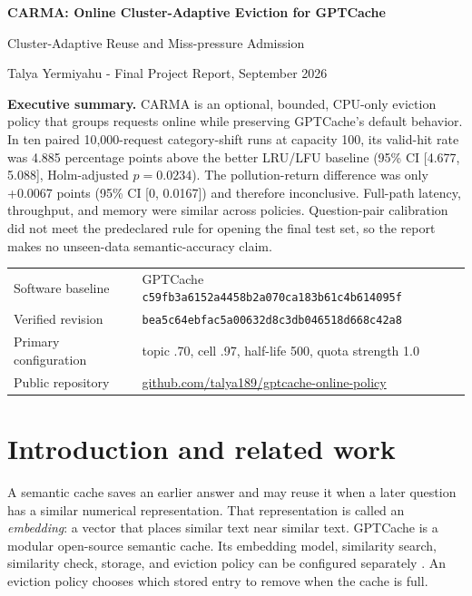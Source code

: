 \documentclass[10pt,letterpaper]{article}
\newcommand{\code}[1]{\texttt{#1}}
\begin{document}
\begin{center}
  {\LARGE\bfseries CARMA: Online Cluster-Adaptive Eviction for GPTCache\par}
  \vspace{0.05in}
  {\large Cluster-Adaptive Reuse and Miss-pressure Admission\par}
  \vspace{0.08in}
  {\normalsize Talya Yermiyahu - Final Project Report, September 2026\par}
\end{center}

\textbf{Executive summary.}
CARMA is an optional, bounded, CPU-only eviction policy that groups requests
online while preserving GPTCache's default behavior.  In ten paired
10,000-request category-shift runs at capacity 100, its valid-hit rate was
4.885 percentage points above the better LRU/LFU baseline (95\% CI
[4.677, 5.088], Holm-adjusted $p=0.0234$).  The pollution-return difference
was only +0.0067 points (95\% CI [0, 0.0167]) and therefore inconclusive.
Full-path latency, throughput, and memory were similar across policies.
Question-pair calibration did not meet the predeclared rule for opening the
final test set, so the report makes no unseen-data semantic-accuracy claim.

\begin{center}
\begin{tabular}{@{}ll@{}}
  Software baseline & GPTCache \code{c59fb3a6152a4458b2a070ca183b61c4b614095f} \\
  Verified revision & \code{bea5c64ebfac5a00632d8c3db046518d668c42a8} \\
  Primary configuration & topic .70, cell .97, half-life 500, quota strength 1.0 \\
  Public repository & \href{https://github.com/talya189/gptcache-online-policy}{github.com/talya189/gptcache-online-policy} \\
\end{tabular}
\end{center}

\section{Introduction and related work}

 A semantic cache saves an earlier answer and may reuse it when a later
question has a similar numerical representation. That representation is
called an \emph{embedding}: a vector that places similar text near similar
text. GPTCache is a modular open-source semantic cache. Its
embedding model, similarity search, similarity check, storage, and eviction
policy can be configured separately \cite{gptcache-paper}. An eviction policy
chooses which stored entry to remove when the cache is full.
\end{document}
